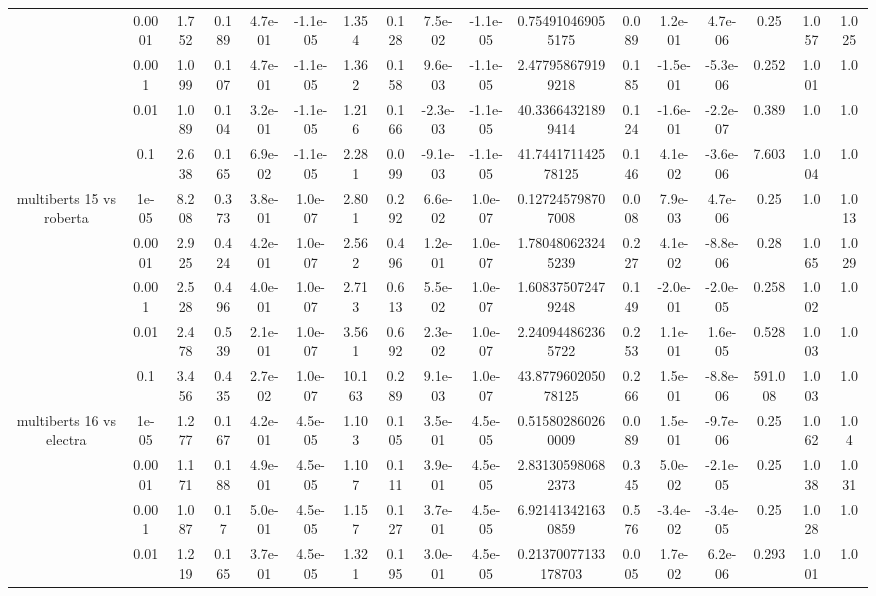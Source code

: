 \begin{tabular}{|c|c|c|c|c|c|c|c|c|c|c|c|c|c|c|c|c|}
 & 0.0001 & 1.752 & 0.189 & 4.7e-01 & -1.1e-05 & 1.354 & 0.128 & 7.5e-02 & -1.1e-05 & 0.754910469055175 & 0.089 & 1.2e-01 & 4.7e-06 & 0.25 & 1.057 & 1.025 \\
 & 0.001 & 1.099 & 0.107 & 4.7e-01 & -1.1e-05 & 1.362 & 0.158 & 9.6e-03 & -1.1e-05 & 2.477958679199218 & 0.185 & -1.5e-01 & -5.3e-06 & 0.252 & 1.001 & 1.0 \\
 & 0.01 & 1.089 & 0.104 & 3.2e-01 & -1.1e-05 & 1.216 & 0.166 & -2.3e-03 & -1.1e-05 & 40.33664321899414 & 0.124 & -1.6e-01 & -2.2e-07 & 0.389 & 1.0 & 1.0 \\
 & 0.1 & 2.638 & 0.165 & 6.9e-02 & -1.1e-05 & 2.281 & 0.099 & -9.1e-03 & -1.1e-05 & 41.744171142578125 & 0.146 & 4.1e-02 & -3.6e-06 & 7.603 & 1.004 & 1.0 \\
\hline
\multirow{5}{*}{multiberts 15 vs roberta } & 1e-05 & 8.208 & 0.373 & 3.8e-01 & 1.0e-07 & 2.801 & 0.292 & 6.6e-02 & 1.0e-07 & 0.127245798707008 & 0.008 & 7.9e-03 & 4.7e-06 & 0.25 & 1.0 & 1.013 \\
 & 0.0001 & 2.925 & 0.424 & 4.2e-01 & 1.0e-07 & 2.562 & 0.496 & 1.2e-01 & 1.0e-07 & 1.780480623245239 & 0.227 & 4.1e-02 & -8.8e-06 & 0.28 & 1.065 & 1.029 \\
 & 0.001 & 2.528 & 0.496 & 4.0e-01 & 1.0e-07 & 2.713 & 0.613 & 5.5e-02 & 1.0e-07 & 1.608375072479248 & 0.149 & -2.0e-01 & -2.0e-05 & 0.258 & 1.002 & 1.0 \\
 & 0.01 & 2.478 & 0.539 & 2.1e-01 & 1.0e-07 & 3.561 & 0.692 & 2.3e-02 & 1.0e-07 & 2.240944862365722 & 0.253 & 1.1e-01 & 1.6e-05 & 0.528 & 1.003 & 1.0 \\
 & 0.1 & 3.456 & 0.435 & 2.7e-02 & 1.0e-07 & 10.163 & 0.289 & 9.1e-03 & 1.0e-07 & 43.877960205078125 & 0.266 & 1.5e-01 & -8.8e-06 & 591.008 & 1.003 & 1.0 \\
\hline
\multirow{5}{*}{multiberts 16 vs electra } & 1e-05 & 1.277 & 0.167 & 4.2e-01 & 4.5e-05 & 1.103 & 0.105 & 3.5e-01 & 4.5e-05 & 0.515802860260009 & 0.089 & 1.5e-01 & -9.7e-06 & 0.25 & 1.062 & 1.04 \\
 & 0.0001 & 1.171 & 0.188 & 4.9e-01 & 4.5e-05 & 1.107 & 0.111 & 3.9e-01 & 4.5e-05 & 2.831305980682373 & 0.345 & 5.0e-02 & -2.1e-05 & 0.25 & 1.038 & 1.031 \\
 & 0.001 & 1.087 & 0.17 & 5.0e-01 & 4.5e-05 & 1.157 & 0.127 & 3.7e-01 & 4.5e-05 & 6.921413421630859 & 0.576 & -3.4e-02 & -3.4e-05 & 0.25 & 1.028 & 1.0 \\
 & 0.01 & 1.219 & 0.165 & 3.7e-01 & 4.5e-05 & 1.321 & 0.195 & 3.0e-01 & 4.5e-05 & 0.21370077133178703 & 0.005 & 1.7e-02 & 6.2e-06 & 0.293 & 1.001 & 1.0 \\

\end{tabular}
